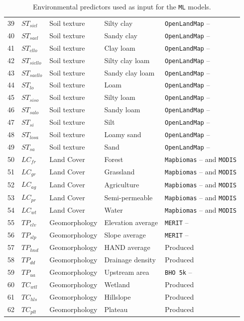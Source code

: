 \documentclass[12pt]{article}
\begin{document}
\begin{table}[htb]
\begin{tabular}{p{0.5cm}p{1cm}p{2cm}p{3.5cm}p{5cm}}
39 & $ST_{sicl}$ & Soil texture & Silty clay & \texttt{OpenLandMap}  -- \cite{hengl2017}\\
40 & $ST_{sacl}$ & Soil texture & Sandy clay & \texttt{OpenLandMap}  -- \cite{hengl2017}\\
41 & $ST_{cllo}$ & Soil texture & Clay loam & \texttt{OpenLandMap}  -- \cite{hengl2017}\\
42 & $ST_{sicllo}$ & Soil texture & Silty clay loam & \texttt{OpenLandMap}  -- \cite{hengl2017}\\
43 & $ST_{sacllo}$ & Soil texture & Sandy clay loam & \texttt{OpenLandMap}  -- \cite{hengl2017}\\
44 & $ST_{lo}$ & Soil texture & Loam & \texttt{OpenLandMap}  -- \cite{hengl2017}\\
45 & $ST_{siso}$ & Soil texture & Silty loam & \texttt{OpenLandMap}  -- \cite{hengl2017}\\
46 & $ST_{salo}$ & Soil texture & Sandy loam & \texttt{OpenLandMap}  -- \cite{hengl2017}\\
47 & $ST_{si}$ & Soil texture & Silt & \texttt{OpenLandMap}  -- \cite{hengl2017}\\
48 & $ST_{losa}$ & Soil texture & Loamy sand & \texttt{OpenLandMap}  -- \cite{hengl2017}\\
49 & $ST_{sa}$ & Soil texture & Sand & \texttt{OpenLandMap}  -- \cite{hengl2017}\\
50 & $LC_{fr}$ & Land Cover & Forest & \texttt{Mapbiomas} -- \cite{souza2020} and \texttt{MODIS}\\
51 & $LC_{gr}$ & Land Cover & Grassland & \texttt{Mapbiomas} -- \cite{souza2020} and \texttt{MODIS}\\
52 & $LC_{ag}$ & Land Cover & Agriculture & \texttt{Mapbiomas} -- \cite{souza2020} and \texttt{MODIS}\\
53 & $LC_{pr}$ & Land Cover & Semi-permeable & \texttt{Mapbiomas} -- \cite{souza2020} and \texttt{MODIS}\\
54 & $LC_{wt}$ & Land Cover & Water & \texttt{Mapbiomas} -- \cite{souza2020} and \texttt{MODIS}\\
55 & $TP_{elv}$ & Geomorphology & Elevation average & \texttt{MERIT} -- \cite{yamazaki2017}\\
56 & $TP_{slp}$ & Geomorphology & Slope average & \texttt{MERIT} -- \cite{yamazaki2017}\\
57 & $TP_{hnd}$ & Geomorphology & HAND average & Produced\\
58 & $TP_{dd}$ & Geomorphology & Drainage density & Produced\\
59 & $TP_{ua}$ & Geomorphology & Upstream area & \texttt{BHO 5k} -- \cite{ana2017}\\
60 & $TC_{wtl}$ & Geomorphology & Wetland & Produced\\
61 & $TC_{hls}$ & Geomorphology & Hillslope & Produced\\
62 & $TC_{plt}$ & Geomorphology & Plateau & Produced\\
\bottomrule
\end{tabular}
\caption{Environmental predictors used as input for the \texttt{ML} models.}
\label{tab:predictors}
\end{table}
\end{document}
